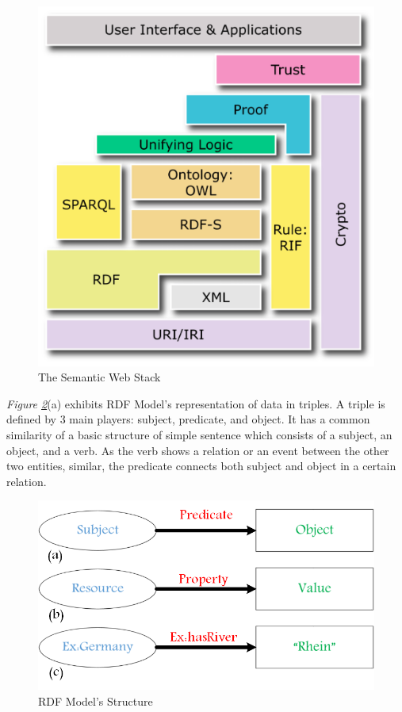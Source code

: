 	\begin{figure}[ht]
	\begin{center}
		\includegraphics[scale=0.5,angle=0]{images/semanticWebStack}
		\caption{The Semantic Web Stack \cite{W3C:SemanticStack:Online}}
		\label{Fig:semanticWebStack}
	\end{center}
\end{figure}
\vspace{12mm} %
\par
{\it Figure \ref{Fig:rdfModel}}(a) exhibits RDF Model's representation of data in triples. A triple is defined by 3 main players: subject, predicate, and object. It has a common similarity of a basic structure of simple sentence which consists of a subject, an object, and a verb. As the verb shows a relation or an event between the other two entities, similar, the predicate connects both subject and object in a certain relation. 
	
\begin{figure}[ht]
	\begin{center}
		\includegraphics[scale=0.4,angle=0]{images/RDF-Model}
		\caption{RDF Model's Structure}
		\label{Fig:rdfModel}
	\end{center}
\end{figure}
 
